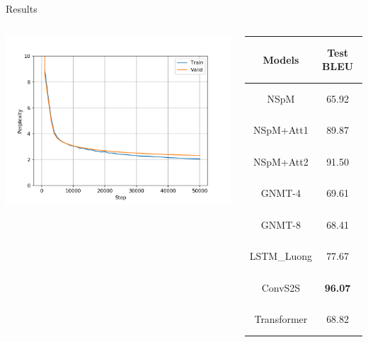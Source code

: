 \documentclass[11pt]{beamer}
\begin{document}
\begin{frame}{Results}
    \begin{example}
        \begin{columns}

            \includegraphics[width=\textwidth]{../results/dbnqa1/run1/neural_sparql_machine/ppls.png}
            \begin{table}
                \tiny
                \begin{tabular}{c|c|c}
                    Models & \textbf{Test BLEU} & Step / Epoch \\
                    \hline
                    NSpM & 65.92 & Step 50k \\
                    NSpM+Att1 & 89.87 & Step 50k \\
                    NSpM+Att2 & 91.50 & Step 50k \\
                    GNMT-4 & 69.61 & Step 30k \\
                    GNMT-8 & 68.41 & Step 30k \\
                    LSTM\_Luong & 77.67 & Epoch 55 \\
                    ConvS2S & \textbf{96.07} & Epoch 54 \\
                    Transformer & 68.82 & Epoch 53 \\
                \end{tabular}
            \end{table}
            \end{columns}
    \end{example}
\end{frame}
\end{document}

